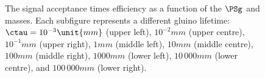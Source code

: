 \begin{figure}
\begin{center}
        \caption{ The signal acceptance times efficiency as a function of 
        the $\PSg$ and \PSGczDo %
        masses. Each subfigure represents a different gluino lifetime:
    $\ctau = 10^{-3}\unit{mm}$ (upper left), $10^{-2}\unit{mm}$ (upper
    centre), $10^{-1}\unit{mm}$ (upper right), $1\unit{mm}$ (middle
    left), $10\unit{mm}$ (middle centre), $100\unit{mm}$ (middle
    right), $1000\unit{mm}$ (lower left), $10\,000\unit{mm}$ (lower
    centre), and $100\,000\unit{mm}$ (lower right).
        }
        \label{fig:T1qqqqLL_eff}
    \end{center}
\end{figure}


